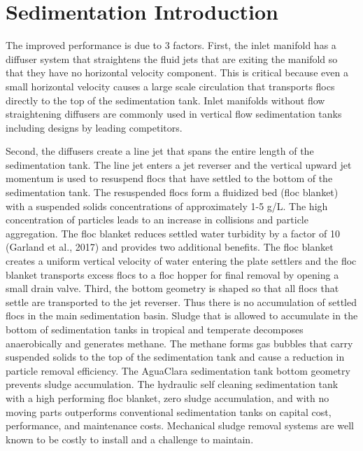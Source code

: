 \documentclass[letterpaper,10pt,english]{sphinxmanual}
\begin{document}
\chapter{Sedimentation Introduction}
\label{\detokenize{Sedimentation/Sed_Intro:sedimentation-introduction}}\label{\detokenize{Sedimentation/Sed_Intro:sedimentation-intro}}\label{\detokenize{Sedimentation/Sed_Intro::doc}}
The improved performance is due to 3 factors. First, the inlet manifold has a diffuser system that straightens the fluid jets that are exiting the manifold so that they have no horizontal velocity component. This is critical because even a small horizontal velocity causes a large scale circulation that transports flocs directly to the top of the sedimentation tank. Inlet manifolds without flow straightening diffusers are commonly used in vertical flow sedimentation tanks including designs by leading competitors.

Second, the diffusers create a line jet that spans the entire length of the sedimentation tank. The line jet enters a jet reverser and the vertical upward jet momentum is used to resuspend flocs that have settled to the bottom of the sedimentation tank. The resuspended flocs form a fluidized bed (floc blanket) with a suspended solids concentrations of approximately 1-5 g/L. The high concentration of particles leads to an increase in collisions and particle aggregation. The floc blanket reduces settled water turbidity by a factor of 10 (Garland et al., 2017) and provides two additional benefits. The floc blanket creates a uniform vertical velocity of water entering the plate settlers and the floc blanket transports excess flocs to a floc hopper for final removal by opening a small drain valve.
Third, the bottom geometry is shaped so that all flocs that settle are transported to the jet reverser. Thus there is no accumulation of settled flocs in the main sedimentation basin. Sludge that is allowed to accumulate in the bottom of sedimentation tanks in tropical and temperate decomposes anaerobically and generates methane. The methane forms gas bubbles that carry suspended solids to the top of the sedimentation tank and cause a reduction in particle removal efficiency.  The AguaClara sedimentation tank bottom geometry prevents sludge accumulation.
The hydraulic self cleaning sedimentation tank with a high performing floc blanket, zero sludge accumulation, and with no moving parts outperforms conventional sedimentation tanks on capital cost, performance, and maintenance costs. Mechanical sludge removal systems are well known to be costly to install and a challenge to maintain.
\end{document}
